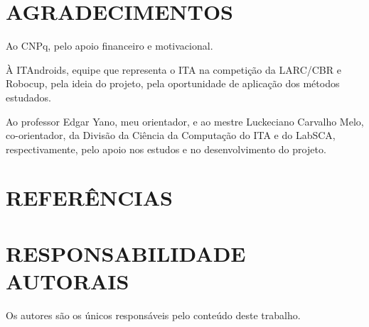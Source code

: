 \documentclass[10pt,fleqn,a4paper]{article}
\begin{document}
    \section{AGRADECIMENTOS}
    
	Ao CNPq, pelo apoio financeiro e motivacional.

	À ITAndroids, equipe que representa o ITA na competição da LARC/CBR e Robocup, pela ideia do projeto, pela oportunidade de aplicação dos métodos estudados.
	
	Ao professor Edgar Yano, meu orientador, e ao mestre Luckeciano Carvalho Melo, co-orientador, da Divisão da Ciência da Computação do ITA e do LabSCA, respectivamente, pelo apoio nos estudos e no desenvolvimento do projeto.


    \section{REFERÊNCIAS}
        
        
        
	\section{RESPONSABILIDADE AUTORAIS}
	
	Os autores são os únicos responsáveis pelo conteúdo deste trabalho.

%
\end{document}
